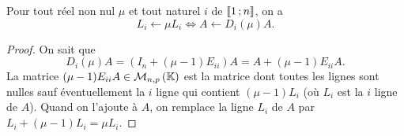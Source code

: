 %
\begin{prop}
  Pour tout réel non nul \(\mu\) et tout naturel \(i\) de
  \(\mathopen{\llbracket}1\mathclose{}\mathpunct{};n\mathclose{\rrbracket}\), on a
  \begin{equation}
    L_i \leftarrow \mu L_i \iff A \leftarrow D_i(\mu)A.
  \end{equation}
\end{prop}
\begin{proof}
  On sait que
  \begin{equation}
    D_i(\mu) A = (I_n + (\mu-1) E_{ii})A= A + (\mu-1)E_{ii}A.
  \end{equation}
  La matrice \((\mu-1)E_{ii}A \in \mathcal{M}_{n,p}\left(\mathbb{K}\right)\) est la matrice dont toutes
  les lignes sont nulles sauf éventuellement la \(i\)\ieme{} ligne qui contient
  \((\mu-1)L_i\) (où \(L_i\) est la \(i\)\ieme{} ligne de \(A\)). Quand on
  l'ajoute à \(A\), on remplace la ligne \(L_i\) de \(A\) par \(L_i +(\mu-1) L_i
  = \mu L_i\).
\end{proof}
%
